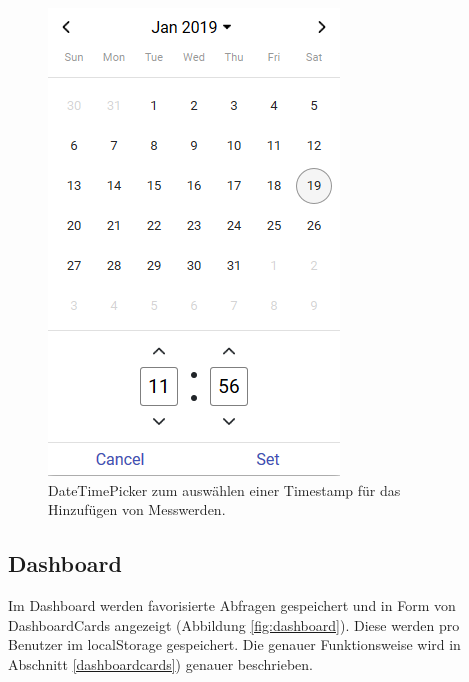 \documentclass[12pt, letterpaper]{article}
\begin{document}
\begin{figure}[H]
    \centering
    \includegraphics[scale=1.0]{img/query/query_picker.png}
    \caption{DateTimePicker zum auswählen einer Timestamp für das Hinzufügen von Messwerden.}
    \label{fig:query_datetime}
\end{figure}

\newpage

\subsection{Dashboard}

Im Dashboard werden favorisierte Abfragen gespeichert und in Form von DashboardCards angezeigt (Abbildung \ref{fig:dashboard}).
Diese werden pro Benutzer im localStorage gespeichert.
Die genauer Funktionsweise wird in Abschnitt \ref{dashboardcards}) genauer beschrieben.
\end{document}
